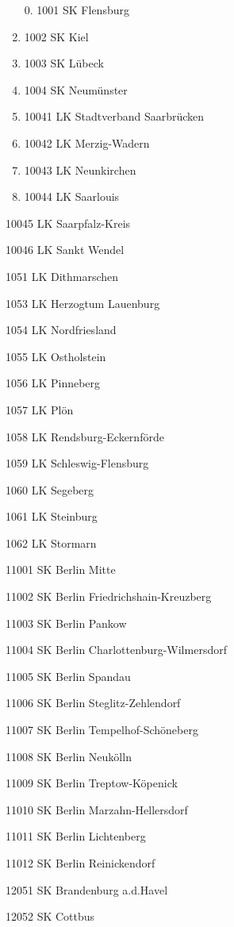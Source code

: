 \begin{enumerate}%
    \item[0.] 1001  SK Flensburg
    \item 1002  SK Kiel
    \item 1003  SK Lübeck
    \item 1004  SK Neumünster
    \item 10041  LK Stadtverband Saarbrücken
    \item 10042  LK Merzig-Wadern
    \item 10043  LK Neunkirchen
    \item 10044  LK Saarlouis
\end{enumerate}

10045  LK Saarpfalz-Kreis

10046  LK Sankt Wendel

1051  LK Dithmarschen

1053  LK Herzogtum Lauenburg

1054  LK Nordfriesland

1055  LK Ostholstein

1056  LK Pinneberg

1057  LK Plön

1058  LK Rendsburg-Eckernförde

1059  LK Schleswig-Flensburg

1060  LK Segeberg

1061  LK Steinburg

1062  LK Stormarn

11001  SK Berlin Mitte

11002  SK Berlin Friedrichshain-Kreuzberg

11003  SK Berlin Pankow

11004  SK Berlin Charlottenburg-Wilmersdorf

11005  SK Berlin Spandau

11006  SK Berlin Steglitz-Zehlendorf

11007  SK Berlin Tempelhof-Schöneberg

11008  SK Berlin Neukölln

11009  SK Berlin Treptow-Köpenick

11010  SK Berlin Marzahn-Hellersdorf

11011  SK Berlin Lichtenberg

11012  SK Berlin Reinickendorf

12051  SK Brandenburg a.d.Havel

12052  SK Cottbus

